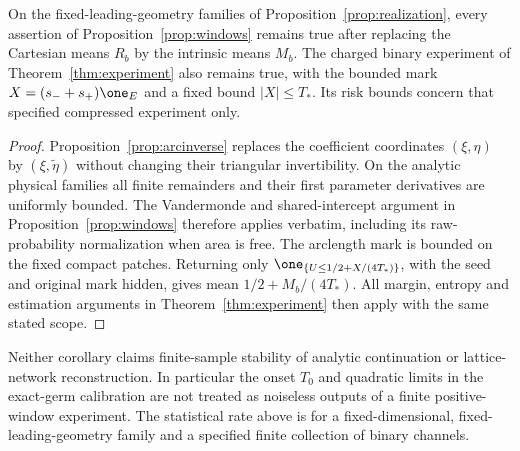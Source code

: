 \begin{corollary}
\label{cor:arcwindows}
On the fixed-leading-geometry families of
Proposition~\ref{prop:realization}, every assertion of
Proposition~\ref{prop:windows} remains true after replacing the
Cartesian means $R_b$ by the intrinsic means $M_b$. The charged
binary experiment of Theorem~\ref{thm:experiment} also remains true,
with the bounded mark
$X=(s_-+s_+)\one_E$ and a fixed bound $|X|\le T_*$.
Its risk bounds concern that specified compressed experiment only.
\end{corollary}
\begin{proof}
Proposition~\ref{prop:arcinverse} replaces the coefficient coordinates
$(\xi,\eta)$ by $(\xi,\widetilde\eta)$ without changing their
triangular invertibility. On the analytic physical families all finite
remainders and their first parameter derivatives are uniformly bounded.
The Vandermonde and shared-intercept argument in
Proposition~\ref{prop:windows} therefore applies verbatim, including
its raw-probability normalization when area is free. The arclength mark
is bounded on the fixed compact patches. Returning only
$\one_{\{U\le1/2+X/(4T_*)\}}$, with the seed and original mark hidden,
gives mean $1/2+M_b/(4T_*)$. All margin, entropy and estimation arguments
in Theorem~\ref{thm:experiment} then apply with the same stated scope.
\end{proof}

Neither corollary claims finite-sample stability of analytic continuation
or lattice-network reconstruction. In particular the onset $T_0$ and
quadratic limits in the exact-germ calibration are not treated as
noiseless outputs of a finite positive-window experiment. The statistical
rate above is for a fixed-dimensional, fixed-leading-geometry family
and a specified finite collection of binary channels.
